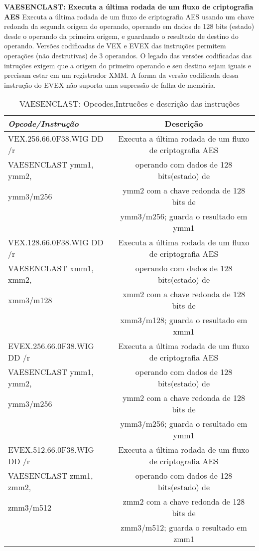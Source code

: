 \documentclass[12pt,a4paper,brazilian,utf8]{ppgsi}
\begin{document}
   \textbf{VAESENCLAST: Executa a última rodada de um fluxo de criptografia AES}
    Executa a última rodada de um fluxo de criptografia AES usando um chave redonda da segunda origem do operando, operando em dados de 128 bits (estado) desde o operando da primeira origem, e guardando o resultado de destino do operando. Versões codificadas de VEX e EVEX das instruções permitem operações (não destrutivas) de 3 operandos. O legado das versões codificadas das intruções exigem que a origem do primeiro operando e seu destino sejam iguais e precisam estar em um registrador XMM.
    A forma da versão codificada dessa instrução do EVEX não suporta uma supressão de falha de memória.
    \begin{table}[H]
        \centering
        \caption{VAESENCLAST: Opcodes,Intrucões e descrição das instruções}
            \begin{tabular}{|l|c|}
                \hline
                \emph{Opcode/Instrução} & Descrição\\
                \hline
                VEX.256.66.0F38.WIG DD /r & Executa a última rodada de um fluxo de criptografia AES\\
                VAESENCLAST ymm1, ymm2, & operando com dados de 128 bits(estado) de \\
                ymm3/m256 & ymm2 com a chave redonda de 128 bits de\\
                & ymm3/m256; guarda o resultado em ymm1\\ 
                \hline
                VEX.128.66.0F38.WIG DD /r & Executa a última rodada de um fluxo de criptografia AES \\
                VAESENCLAST xmm1, xmm2, & operando com dados de 128 bits(estado) de \\
                xmm3/m128 & xmm2 com a chave redonda de 128 bits de \\
                & xmm3/m128; guarda o resultado em xmm1 \\
                \hline
                EVEX.256.66.0F38.WIG DD /r & Executa a última rodada de um fluxo de criptografia AES \\
                VAESENCLAST ymm1, ymm2, & operando com dados de 128 bits(estado) de \\
                ymm3/m256 &  ymm2 com a chave redonda de 128 bits de \\
                 & ymm3/m256; guarda o resultado em ymm1 \\ 
                \hline
                EVEX.512.66.0F38.WIG DD /r & Executa a última rodada de um fluxo de criptografia AES \\
                VAESENCLAST zmm1, zmm2, & operando com dados de 128 bits(estado) de \\
                zmm3/m512 &  zmm2 com a chave redonda de 128 bits de \\
                & zmm3/m512; guarda o resultado em zmm1 \\
                \hline
            \end{tabular}
        \label{tab:dimensoes}
    \end{table}
		
\end{document}
